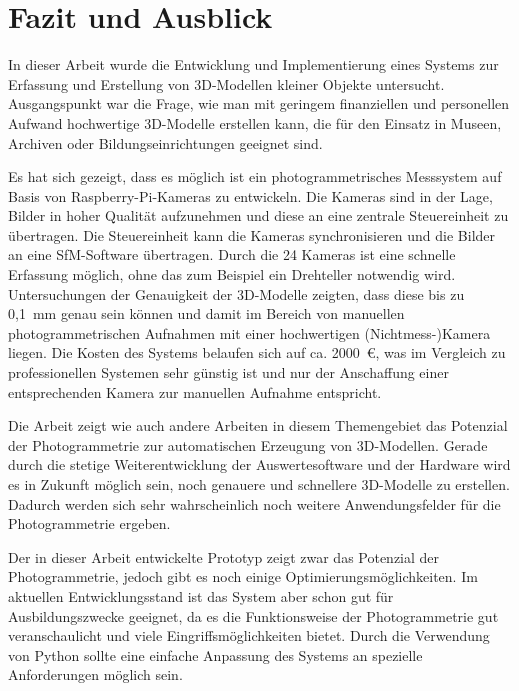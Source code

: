 \documentclass[./00PhotoBox.tex]{subfiles}
\begin{document}
\chapter{Fazit und Ausblick}
\label{c:fazitausblick}


In dieser Arbeit wurde die Entwicklung und Implementierung eines Systems zur Erfassung und Erstellung von 3D-Modellen kleiner Objekte untersucht. Ausgangspunkt war die Frage, wie man mit geringem finanziellen und personellen Aufwand hochwertige 3D-Modelle erstellen kann, die für den Einsatz in Museen, Archiven oder Bildungseinrichtungen geeignet sind.

Es hat sich gezeigt, dass es möglich ist ein photogrammetrisches Messsystem auf Basis von Raspberry-Pi-Kameras zu entwickeln. Die Kameras sind in der Lage, Bilder in hoher Qualität aufzunehmen und diese an eine zentrale Steuereinheit zu übertragen. Die Steuereinheit kann die Kameras synchronisieren und die Bilder an eine SfM-Software übertragen. Durch die 24 Kameras ist eine schnelle Erfassung möglich, ohne das zum Beispiel ein Drehteller notwendig wird. Untersuchungen der Genauigkeit der 3D-Modelle zeigten, dass diese bis zu 0,1~mm genau sein können und damit im Bereich von manuellen photogrammetrischen Aufnahmen mit einer hochwertigen (Nichtmess-)Kamera liegen. Die Kosten des Systems belaufen sich auf ca. 2000~€, was im Vergleich zu professionellen Systemen sehr günstig ist und nur der Anschaffung einer entsprechenden Kamera zur manuellen Aufnahme entspricht.



Die Arbeit zeigt wie auch andere Arbeiten in diesem Themengebiet das Potenzial der Photogrammetrie zur automatischen Erzeugung von 3D-Modellen. Gerade durch die stetige Weiterentwicklung der Auswertesoftware und der Hardware wird es in Zukunft möglich sein, noch genauere und schnellere 3D-Modelle zu erstellen. Dadurch werden sich sehr wahrscheinlich noch weitere Anwendungsfelder für die Photogrammetrie ergeben.

Der in dieser Arbeit entwickelte Prototyp zeigt zwar das Potenzial der Photogrammetrie, jedoch gibt es noch einige Optimierungsmöglichkeiten. Im aktuellen Entwicklungsstand ist das System aber schon gut für Ausbildungszwecke geeignet, da es die Funktionsweise der Photogrammetrie gut veranschaulicht und viele Eingriffsmöglichkeiten bietet. Durch die Verwendung von Python sollte eine einfache Anpassung des Systems an spezielle Anforderungen möglich sein.
\end{document}
